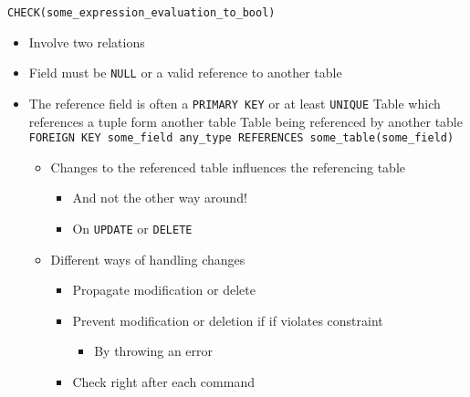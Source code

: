 \begin{itemize}
\begin{itemize}
             \verb+CHECK(some_expression_evaluation_to_bool)+
        \end{itemize}
        \begin{itemize}
            \item Involve two relations
            \item Field must be \verb+NULL+ or a valid reference to another table
            \item The reference field is often a \verb+PRIMARY KEY+ or at least \verb+UNIQUE+
             Table which references a tuple form another table
             Table being referenced by another table
             \verb+FOREIGN KEY some_field any_type REFERENCES some_table(some_field)+
                \begin{itemize}
                    \item Changes to the referenced table influences the referencing table
                        \begin{itemize}
                            \item And not the other way around!
                            \item On \verb+UPDATE+ or \verb+DELETE+
                        \end{itemize}
                    \item Different ways of handling changes
                        \begin{itemize}
                            \item Propagate modification or delete
                        \end{itemize}
                        \begin{itemize}
                            \item Prevent modification or deletion if if violates constraint
                                \begin{itemize}
                                    \item By throwing an error
                                \end{itemize}
                            \item Check right after each command
                        \end{itemize}
                        \begin{itemize}

\end{itemize}
\end{itemize}
\end{itemize}
\end{itemize}

